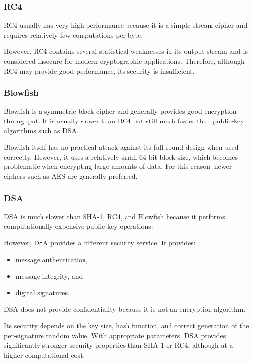 \documentclass[a4paper, 10pt]{article}
\begin{document}
\begin{problem}
\begin{subproblems_alpha}
\begin{solution}
		      \subsubsection*{RC4}

		      RC4 usually has very high performance because it is a simple stream cipher and requires relatively few computations per byte.

		      However, RC4 contains several statistical weaknesses in its output stream and is considered insecure for modern cryptographic applications. Therefore, although RC4 may provide good performance, its security is insufficient.

		      \subsubsection*{Blowfish}

		      Blowfish is a symmetric block cipher and generally provides good encryption throughput. It is usually slower than RC4 but still much faster than public-key algorithms such as DSA.

		      Blowfish itself has no practical attack against its full-round design when used correctly. However, it uses a relatively small 64-bit block size, which becomes problematic when encrypting large amounts of data. For this reason, newer ciphers such as AES are generally preferred.

		      \subsubsection*{DSA}

		      DSA is much slower than SHA-1, RC4, and Blowfish because it performs computationally expensive public-key operations.

		      However, DSA provides a different security service. It provides:

		      \begin{itemize}
			      \item message authentication,
			      \item message integrity, and
			      \item digital signatures.
		      \end{itemize}

		      DSA does not provide confidentiality because it is not an encryption algorithm.

		      Its security depends on the key size, hash function, and correct generation of the per-signature random value. With appropriate parameters, DSA provides significantly stronger security properties than SHA-1 or RC4, although at a higher computational cost.


\end{solution}
\end{subproblems_alpha}
\end{problem}
\end{document}
